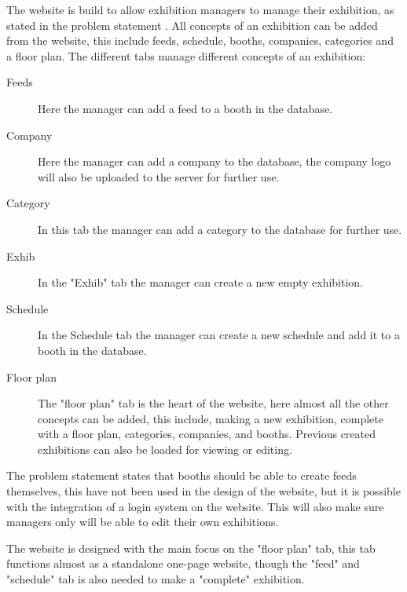 \label{sec:websiteimplementation}
The website is build to allow exhibition managers to manage their exhibition, as stated in the problem statement . All concepts of an exhibition can be added from the website, this include feeds, schedule, booths, companies, categories and a floor plan.
The different tabs manage different concepts of an exhibition:


\begin{description}
	\item[Feeds] Here the manager can add a feed to a booth in the database.
	\item[Company] Here the manager can add a company to the database, the company logo will also be uploaded to the server for further use.
	\item[Category] In this tab the manager can add a category to the database for further use.
	\item[Exhib] In the "Exhib" tab the manager can create a new empty exhibition.
	\item[Schedule] In the Schedule tab the manager can create a new schedule and add it to a booth in the database.
	\item[Floor plan] The "floor plan" tab is the heart of the website, here almost all the other concepts can be added, this include, making a new exhibition, complete with a floor plan, categories, companies, and booths. Previous created exhibitions can also be loaded for viewing or editing.
\end{description}


The problem statement  states that booths should be able to create feeds themselves, this have not been used in the design of the website, but it is possible with the integration of a login system on the website. This will also make sure managers only will be able to edit their own exhibitions.


The website is designed with the main focus on the "floor plan" tab, this tab functions almost as a standalone one-page website, though the "feed" and "schedule" tab is also needed to make a "complete" exhibition.



